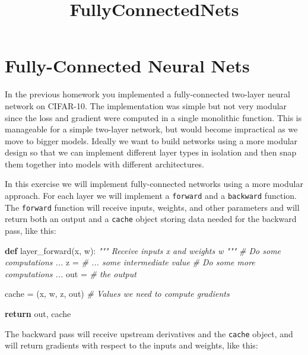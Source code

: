 \documentclass[11pt]{article}
\title{FullyConnectedNets}
\newenvironment{Shaded}{}{}
\newcommand{\KeywordTok}[1]{\textcolor[rgb]{0.00,0.44,0.13}{\textbf{{#1}}}}
\newcommand{\CommentTok}[1]{\textcolor[rgb]{0.38,0.63,0.69}{\textit{{#1}}}}
\newcommand{\NormalTok}[1]{{#1}}
\newcommand{\ControlFlowTok}[1]{\textcolor[rgb]{0.00,0.44,0.13}{\textbf{{#1}}}}
\newcommand{\OperatorTok}[1]{\textcolor[rgb]{0.40,0.40,0.40}{{#1}}}
\begin{document}
    
    \maketitle
    
    

    
    \hypertarget{fully-connected-neural-nets}{%
\section{Fully-Connected Neural
Nets}\label{fully-connected-neural-nets}}

In the previous homework you implemented a fully-connected two-layer
neural network on CIFAR-10. The implementation was simple but not very
modular since the loss and gradient were computed in a single monolithic
function. This is manageable for a simple two-layer network, but would
become impractical as we move to bigger models. Ideally we want to build
networks using a more modular design so that we can implement different
layer types in isolation and then snap them together into models with
different architectures.

    In this exercise we will implement fully-connected networks using a more
modular approach. For each layer we will implement a \texttt{forward}
and a \texttt{backward} function. The \texttt{forward} function will
receive inputs, weights, and other parameters and will return both an
output and a \texttt{cache} object storing data needed for the backward
pass, like this:

\begin{Shaded}
\begin{Highlighting}[]
\KeywordTok{def}\NormalTok{ layer\_forward(x, w):}
  \CommentTok{""" Receive inputs x and weights w """}
  \CommentTok{\# Do some computations ...}
\NormalTok{  z }\OperatorTok{=} \CommentTok{\# ... some intermediate value}
  \CommentTok{\# Do some more computations ...}
\NormalTok{  out }\OperatorTok{=} \CommentTok{\# the output}
   
\NormalTok{  cache }\OperatorTok{=}\NormalTok{ (x, w, z, out) }\CommentTok{\# Values we need to compute gradients}
   
  \ControlFlowTok{return}\NormalTok{ out, cache}
\end{Highlighting}
\end{Shaded}

The backward pass will receive upstream derivatives and the
\texttt{cache} object, and will return gradients with respect to the
inputs and weights, like this:
\end{document}
